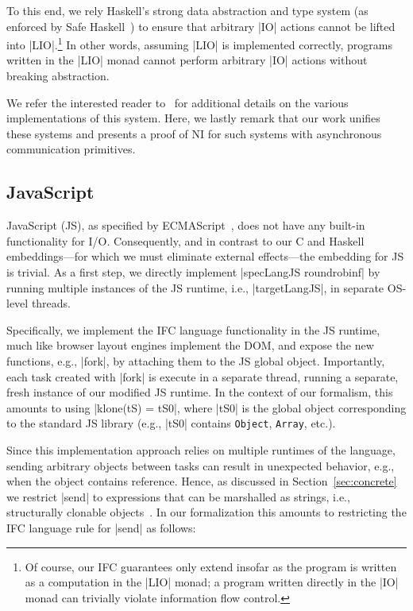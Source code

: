 To this end, we rely Haskell's strong data abstraction and type system
(as enforced by Safe Haskell~\cite{Terei:2012:SH:2364506.2364524}) to
ensure that arbitrary |IO| actions cannot be lifted into
|LIO|.\footnote{
Of course, our IFC guarantees only extend insofar as the program is
written as a computation in the |LIO| monad; a program written
directly in the |IO| monad can trivially violate information flow
control.
}
%
In other words, assuming |LIO| is implemented correctly, programs
written in the |LIO| monad cannot perform arbitrary |IO| actions
without breaking abstraction.
 
We refer the interested reader to~ for
additional details on the various implementations of this system.
%
Here, we lastly remark that our work unifies these systems and
presents a proof of NI for such systems with asynchronous
communication primitives.


\subsection{JavaScript}
\label{sec:real:js}

JavaScript (JS), as specified by ECMAScript~\tocite{}, does not have any
built-in functionality for I/O.
%
Consequently, and in contrast to our C and Haskell embeddings---for
which we must eliminate external effects---the embedding for JS is
trivial.
%
As a first step, we directly implement |specLangJS roundrobinf| by
running multiple instances of the JS runtime, i.e., |targetLangJS|, in
separate OS-level threads.

Specifically, we implement the IFC language functionality in the JS
runtime, much like browser layout engines implement the DOM, and
expose the new functions, e.g., |fork|, by attaching them to the JS
global object.
%
Importantly, each task created with |fork| is execute in a separate
thread, running a separate, fresh instance of our modified JS runtime.
%
In the context of our formalism, this amounts to using |klone(tS) =
tS0|, where |tS0| is the global object corresponding to the standard
JS library (e.g., |tS0| contains \texttt{Object}, \texttt{Array},
etc.).

Since this implementation approach relies on multiple runtimes of the
language, sending arbitrary objects between tasks can result in
unexpected behavior, e.g., when the object contains reference.
%
Hence, as discussed in Section~\ref{sec:concrete} we restrict |send|
to expressions that can be marshalled as strings, i.e., structurally
clonable objects~\tocite{}.
%
In our formalization this amounts to restricting the IFC language rule
for |send| as follows:


